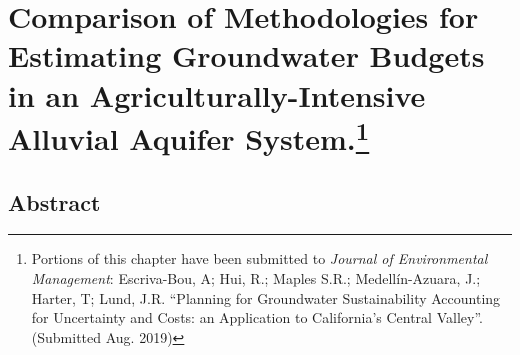 \chapter[Comparison of Methods for Estimating Groundwater Budgets in an Agriculturally-Intensive Alluvial Aquifer System]{Comparison of Methodologies for Estimating Groundwater Budgets in an Agriculturally-Intensive Alluvial Aquifer System.\footnote[1]{Portions of this chapter have been submitted to \textit{Journal of Environmental Management}: Escriva-Bou, A; Hui, R.; Maples S.R.; Medellín-Azuara, J.; Harter, T; Lund, J.R. ``Planning for Groundwater Sustainability Accounting for Uncertainty and Costs: an Application to California's Central Valley''.  (Submitted Aug. 2019)}}

\section{Abstract}

